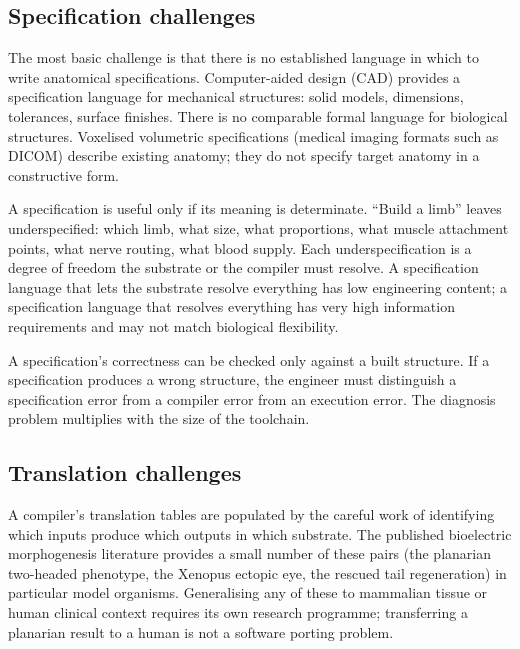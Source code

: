 \subsection{Specification challenges}

 The most basic challenge is that there is
no established language in which to write anatomical specifications.
Computer-aided design (CAD) provides a specification language for
mechanical structures: solid models, dimensions, tolerances, surface
finishes. There is no comparable formal language for biological
structures. Voxelised volumetric specifications (medical imaging
formats such as DICOM) describe existing anatomy; they do not specify
target anatomy in a constructive form.

 A specification is useful only if its
meaning is determinate. ``Build a limb'' leaves underspecified: which
limb, what size, what proportions, what muscle attachment points, what
nerve routing, what blood supply. Each underspecification is a degree
of freedom the substrate or the compiler must resolve. A specification
language that lets the substrate resolve everything has low engineering
content; a specification language that resolves everything has very
high information requirements and may not match biological flexibility.

 A specification's correctness can be checked
only against a built structure. If a specification produces a wrong
structure, the engineer must distinguish a specification error from a
compiler error from an execution error. The diagnosis problem
multiplies with the size of the toolchain.

\subsection{Translation challenges}

 A compiler's translation
tables are populated by the careful work of identifying which inputs
produce which outputs in which substrate. The published bioelectric
morphogenesis literature provides a small number of these pairs (the
planarian two-headed phenotype, the Xenopus ectopic eye, the rescued
tail regeneration) in particular model organisms. Generalising any of
these to mammalian tissue or human clinical context requires its own
research programme; transferring a planarian result to a human is not a
software porting problem.

